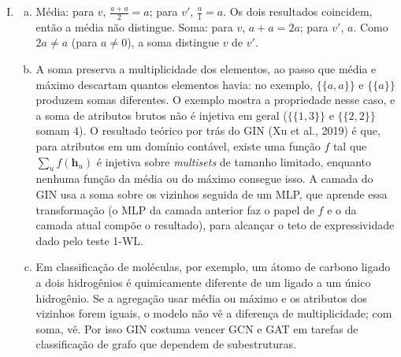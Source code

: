 \documentclass{dlproblemset}
\begin{document}
\begin{enumerate}[I)]
    \item
    \begin{enumerate}[(a)]
        \item Média: para $v$, $\tfrac{a+a}{2} = a$; para $v'$, $\tfrac{a}{1} = a$. Os dois resultados coincidem, então a média não distingue. Soma: para $v$, $a + a = 2a$; para $v'$, $a$. Como $2a \neq a$ (para $a \neq 0$), a soma distingue $v$ de $v'$.
        \item A soma preserva a multiplicidade dos elementos, ao passo que média e máximo descartam quantos elementos havia: no exemplo, $\{\!\!\{a,a\}\!\!\}$ e $\{\!\!\{a\}\!\!\}$ produzem somas diferentes. O exemplo mostra a propriedade nesse caso, e a soma de atributos brutos não é injetiva em geral ($\{\!\!\{1,3\}\!\!\}$ e $\{\!\!\{2,2\}\!\!\}$ somam $4$). O resultado teórico por trás do GIN (Xu et al., 2019) é que, para atributos em um domínio contável, existe uma função $f$ tal que $\sum_{u} f(\mathbf{h}_u)$ é injetiva sobre \textit{multisets} de tamanho limitado, enquanto nenhuma função da média ou do máximo consegue isso. A camada do GIN usa a soma sobre os vizinhos seguida de um MLP, que aprende essa transformação (o MLP da camada anterior faz o papel de $f$ e o da camada atual compõe o resultado), para alcançar o teto de expressividade dado pelo teste 1-WL.
        \item Em classificação de moléculas, por exemplo, um átomo de carbono ligado a dois hidrogênios é quimicamente diferente de um ligado a um único hidrogênio. Se a agregação usar média ou máximo e os atributos dos vizinhos forem iguais, o modelo não vê a diferença de multiplicidade; com soma, vê. Por isso GIN costuma vencer GCN e GAT em tarefas de classificação de grafo que dependem de subestruturas.
    \end{enumerate}


\end{enumerate}
\end{document}
